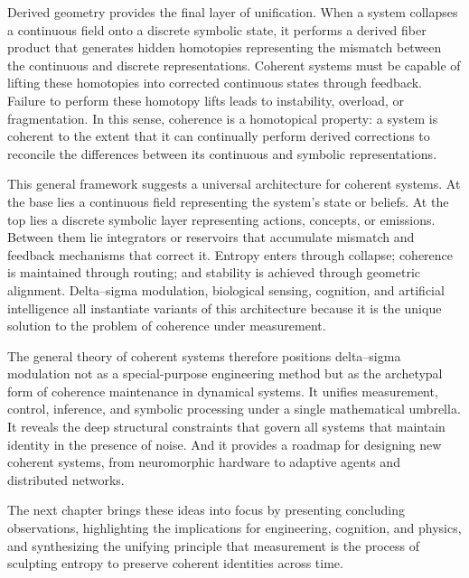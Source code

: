 Derived geometry provides the final layer of unification. When a system collapses a continuous field onto a discrete symbolic state, it performs a derived fiber product that generates hidden homotopies representing the mismatch between the continuous and discrete representations. Coherent systems must be capable of lifting these homotopies into corrected continuous states through feedback. Failure to perform these homotopy lifts leads to instability, overload, or fragmentation. In this sense, coherence is a homotopical property: a system is coherent to the extent that it can continually perform derived corrections to reconcile the differences between its continuous and symbolic representations.

This general framework suggests a universal architecture for coherent systems. At the base lies a continuous field representing the system’s state or beliefs. At the top lies a discrete symbolic layer representing actions, concepts, or emissions. Between them lie integrators or reservoirs that accumulate mismatch and feedback mechanisms that correct it. Entropy enters through collapse; coherence is maintained through routing; and stability is achieved through geometric alignment. Delta–sigma modulation, biological sensing, cognition, and artificial intelligence all instantiate variants of this architecture because it is the unique solution to the problem of coherence under measurement.

The general theory of coherent systems therefore positions delta–sigma modulation not as a special-purpose engineering method but as the archetypal form of coherence maintenance in dynamical systems. It unifies measurement, control, inference, and symbolic processing under a single mathematical umbrella. It reveals the deep structural constraints that govern all systems that maintain identity in the presence of noise. And it provides a roadmap for designing new coherent systems, from neuromorphic hardware to adaptive agents and distributed networks.

The next chapter brings these ideas into focus by presenting concluding observations, highlighting the implications for engineering, cognition, and physics, and synthesizing the unifying principle that measurement is the process of sculpting entropy to preserve coherent identities across time.

